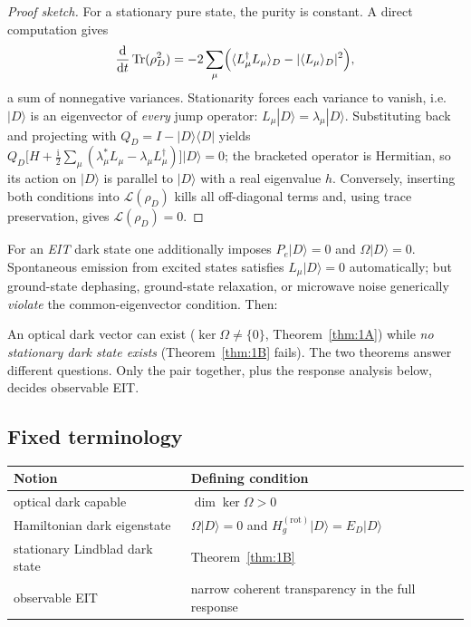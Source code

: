 \documentclass[11pt,a4paper]{article}
\theoremstyle{remark}
\newcommand{\dd}{\mathrm{d}}
\newcommand{\im}{\mathrm{i}}
\newcommand{\Tr}{\operatorname{Tr}}
\newcommand{\ket}[1]{|#1\rangle}
\newcommand{\bra}[1]{\langle #1|}
\begin{document}
\begin{proof}[Proof sketch]
For a stationary pure state, the purity is constant. A direct computation
gives
\[
\frac{\dd}{\dd t}\Tr(\rho_D^2)
 = -2\sum_\mu\Bigl(\langle L_\mu^\dagger L_\mu\rangle_D
   -|\langle L_\mu\rangle_D|^2\Bigr),
\]
a sum of nonnegative variances. Stationarity forces each variance to vanish,
i.e.\ $\ket{D}$ is an eigenvector of \emph{every} jump operator:
$L_\mu\ket{D}=\lambda_\mu\ket{D}$. Substituting back and projecting with
$Q_D=I-\ket{D}\bra{D}$ yields
$Q_D\bigl[H+\tfrac{\im}{2}\sum_\mu(\lambda_\mu^*L_\mu
-\lambda_\mu L_\mu^\dagger)\bigr]\ket{D}=0$; the bracketed operator is
Hermitian, so its action on $\ket{D}$ is parallel to $\ket{D}$ with a real
eigenvalue $h$. Conversely, inserting both conditions into $\mathcal{L}(\rho_D)$
kills all off-diagonal terms and, using trace preservation, gives
$\mathcal{L}(\rho_D)=0$.
\end{proof}

For an \emph{EIT} dark state one additionally imposes $P_e\ket{D}=0$ and
$\Omega\ket{D}=0$. Spontaneous emission from excited states satisfies
$L_\mu\ket{D}=0$ automatically; but ground-state dephasing, ground-state
relaxation, or microwave noise generically \emph{violate} the
common-eigenvector condition. Then:

\begin{warningbox}
An optical dark vector can exist ($\ker\Omega\neq\{0\}$, Theorem~\ref{thm:1A})
while \emph{no stationary dark state exists} (Theorem~\ref{thm:1B} fails). The
two theorems answer different questions. Only the pair together, plus the
response analysis below, decides observable EIT.
\end{warningbox}

\subsection{Fixed terminology}

\begin{center}
\begin{tabular}{ll}
\toprule
\textbf{Notion} & \textbf{Defining condition}\\
\midrule
optical dark capable & $\dim\ker\Omega>0$\\
Hamiltonian dark eigenstate & $\Omega\ket{D}=0$ and $H_g^{\mathrm{(rot)}}\ket{D}=E_D\ket{D}$\\
stationary Lindblad dark state & Theorem~\ref{thm:1B}\\
observable EIT & narrow coherent transparency in the full response\\
\bottomrule
\end{tabular}
\end{center}
\end{document}
